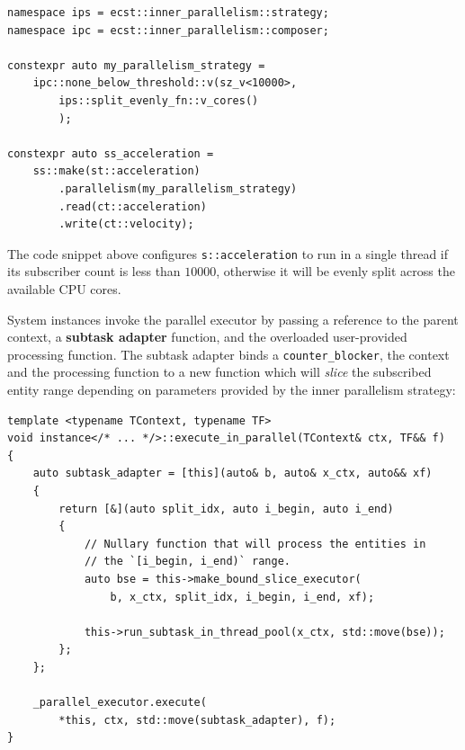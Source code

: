 \documentclass[twoside, 12pt, a4paper, openright]{book}
\begin{document}
\begin{verbatim}
namespace ips = ecst::inner_parallelism::strategy;
namespace ipc = ecst::inner_parallelism::composer;

constexpr auto my_parallelism_strategy =
    ipc::none_below_threshold::v(sz_v<10000>,
        ips::split_evenly_fn::v_cores()
        );

constexpr auto ss_acceleration =
    ss::make(st::acceleration)
        .parallelism(my_parallelism_strategy)
        .read(ct::acceleration)
        .write(ct::velocity);
\end{verbatim}

The code snippet above configures
\texttt{s::acceleration}
to run in a single thread if its subscriber count is less than
\(10000\), otherwise it will be evenly split across the available CPU
cores.

System instances invoke the parallel executor by passing a reference to
the parent context, a \textbf{subtask adapter} function, and the
overloaded user-provided processing function. The subtask adapter binds
a
\texttt{counter_blocker},
the context and the processing function to a new function which will
\emph{slice} the subscribed entity range depending on parameters
provided by the inner parallelism strategy:

\begin{verbatim}
template <typename TContext, typename TF>
void instance</* ... */>::execute_in_parallel(TContext& ctx, TF&& f)
{
    auto subtask_adapter = [this](auto& b, auto& x_ctx, auto&& xf)
    {
        return [&](auto split_idx, auto i_begin, auto i_end)
        {
            // Nullary function that will process the entities in
            // the `[i_begin, i_end)` range.
            auto bse = this->make_bound_slice_executor(
                b, x_ctx, split_idx, i_begin, i_end, xf);

            this->run_subtask_in_thread_pool(x_ctx, std::move(bse));
        };
    };

    _parallel_executor.execute(
        *this, ctx, std::move(subtask_adapter), f);
}
\end{verbatim}
\end{document}
